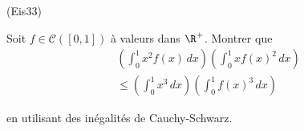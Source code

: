 \begin{tiny}(Eis33)\end{tiny} Soit $f\in \mathcal{C}([0,1])$ à valeurs dans $\R^+$. Montrer que
\begin{multline*}
 \left( \int_{0}^{1}x^2 f(x)\,dx\right) \left( \int_{0}^{1}x f(x)^2\,dx\right) \\
 \leq 
 \left( \int_{0}^{1}x^3\,dx\right) \left( \int_{0}^{1} f(x)^3\,dx\right)
\end{multline*}

en utilisant des inégalités de Cauchy-Schwarz.

